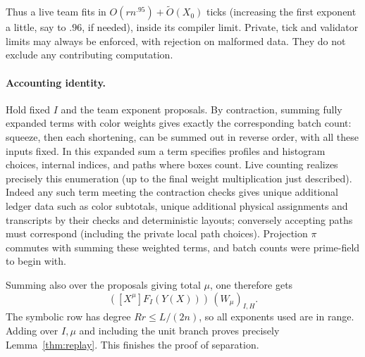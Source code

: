 \documentclass[11pt,letterpaper]{article}
\theoremstyle{definition}
\numberwithin{equation}{section}
\begin{document}
Thus a live team fits in $O(rn^{.95})+\widetilde{O}(X_0)$ ticks (increasing the first exponent a little, say
to $.96$, if needed), inside its compiler limit. Private, tick and validator limits may always
be enforced, with rejection on malformed data. They do not exclude any contributing
computation.

\paragraph{Accounting identity.}
Hold fixed $I$ and the team exponent proposals. By contraction,
summing fully expanded terms with color weights gives exactly the corresponding batch
count: squeeze, then each shortening, can be summed out in reverse order, with all these
inputs fixed. In this expanded sum a term specifies profiles and histogram choices, internal
indices, and paths where boxes count. Live counting realizes precisely this enumeration (up to
the final weight multiplication just described). Indeed any such term meeting the contraction
checks gives unique additional ledger data such as color subtotals, unique additional physical
assignments and transcripts by their checks and deterministic layouts; conversely accepting
paths must correspond (including the private local path choices). Projection $\pi$ commutes
with summing these weighted terms, and batch counts were prime-field to begin with.

Summing also over the proposals giving total $\mu$, one therefore gets
\[
  ([X^\mu]F_I(Y(X)))\,(W_\mu)_{I,H}.
\]
The symbolic row has degree $Rr\le L/(2n)$, so all exponents used are in range. Adding over
$I,\mu$ and including the unit branch proves precisely Lemma~\ref{thm:replay}. This finishes the proof of
separation.
\end{document}
